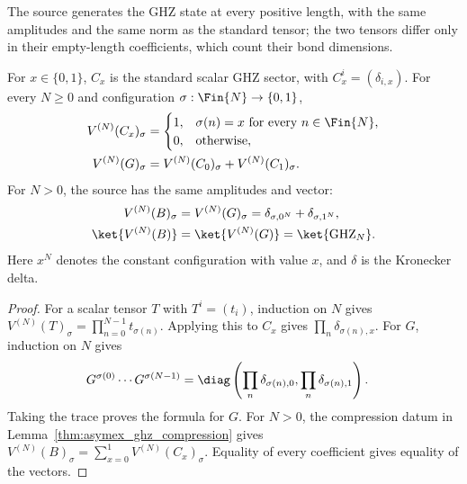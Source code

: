 The source generates the GHZ state at every positive length, with the
same amplitudes and the same norm as the standard tensor; the two
tensors differ only in their empty-length coefficients, which count
their bond dimensions.

\begin{lemma}
    \label{thm:asymex_ghz_state}
    \leanok
    For $x\in\{0,1\}$, $C_x$ is the standard scalar GHZ sector,
    with $C_x^i=(\delta_{i,x})$. For every $N\geq0$ and configuration
    $\sigma:\Fin{N}\to\{0,1\}$,
    \begin{align}
        V^{(N)}(C_x)_\sigma
         & =\begin{cases}
                1, & \sigma(n)=x\text{ for every }n\in\Fin{N}, \\
                0, & \text{otherwise},
            \end{cases}
        \notag                                             \\
        V^{(N)}(G)_\sigma
         & =V^{(N)}(C_0)_\sigma+V^{(N)}(C_1)_\sigma.
        \notag
    \end{align}
    For $N>0$, the source has the same amplitudes and vector:
    \begin{align}
        V^{(N)}(B)_\sigma
         & =V^{(N)}(G)_\sigma
        =\delta_{\sigma,0^N}+\delta_{\sigma,1^N},
        \label{eq:asymex_ghz_amplitude}            \\
        \ket{V^{(N)}(B)}
         & =\ket{V^{(N)}(G)}=\ket{\mathrm{GHZ}_N}.
        \notag
    \end{align}
    Here $x^N$ denotes the constant configuration with value $x$, and
    $\delta$ is the Kronecker delta.
\end{lemma}

\begin{proof}
    \leanok
    For a scalar tensor $T$ with $T^i=(t_i)$, induction on $N$ gives
    $V^{(N)}(T)_\sigma=\prod_{n=0}^{N-1}t_{\sigma(n)}$.
    Applying this to $C_x$ gives $\prod_n\delta_{\sigma(n),x}$.
    For $G$, induction on $N$ gives
    \begin{align}
        G^{\sigma(0)}\cdots G^{\sigma(N-1)}
         & =\diag\left(\prod_n\delta_{\sigma(n),0},
        \prod_n\delta_{\sigma(n),1}\right).
        \notag
    \end{align}
    Taking the trace proves the formula for $G$. For $N>0$, the
    compression datum in Lemma~\ref{thm:asymex_ghz_compression} gives
    $V^{(N)}(B)_\sigma=\sum_{x=0}^1V^{(N)}(C_x)_\sigma$.
    Equality of every coefficient gives equality of the vectors.
\end{proof}

